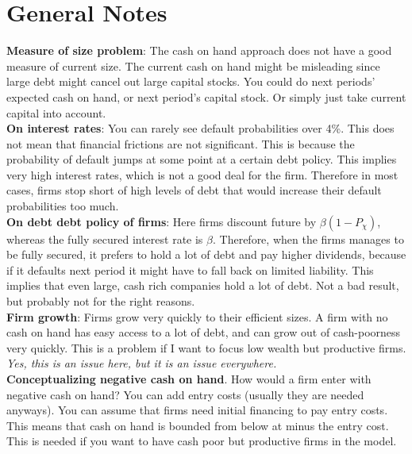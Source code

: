 \documentclass[12pt]{article}
\begin{document}
\newpage

\section*{General Notes}
\textbf{Measure of size problem}: The cash on hand approach does not have a good measure of current size. The current cash on hand might be misleading since large debt might cancel out large capital stocks. You could do next periods' expected cash on hand, or next period's capital stock. Or simply just take current capital into account. \vspace{3mm} \\
\textbf{On interest rates}: You can rarely see default probabilities over 4\%. This does not mean that financial frictions are not significant. This is because the probability of default jumps at some point at a certain debt policy. This implies very high interest rates, which is not a good deal for the firm. Therefore in most cases, firms stop short of high levels of debt that would increase their default probabilities too much. \vspace{3mm} \\
\textbf{On debt debt policy of firms}: Here firms discount future by $\beta(1-P_\chi)$, whereas the fully secured interest rate is $\beta$. Therefore, when the firms manages to be fully secured, it prefers to hold a lot of debt and pay higher dividends, because if it defaults next period it might have to fall back on limited liability. This implies that even large, cash rich companies hold a lot of debt. Not a bad result, but probably not for the right reasons. \vspace{3mm} \\
\textbf{Firm growth}: Firms grow very quickly to their efficient sizes. A firm with no cash on hand has easy access to a lot of debt, and can grow out of cash-poorness very quickly. This is a problem if I want to focus low wealth but productive firms. \textit{Yes, this is an issue here, but it is an issue everywhere.} \vspace{3mm} \\
\textbf{Conceptualizing negative cash on hand}. How would a firm enter with negative cash on hand? You can add entry costs (usually they are needed anyways). You can assume that firms need initial financing to pay entry costs. This means that cash on hand is bounded from below at minus the entry cost. This is needed if you want to have cash poor but productive firms in the model. \vspace{3mm} \\
\end{document}
